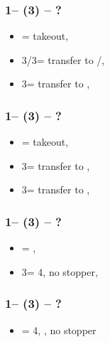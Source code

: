 \documentclass[12pt, a4paper]{article}
\begin{document}

\subsubsection*{1\clubs -- (3\clubs) -- ?}
\begin{itemize}
    \item \dbl = takeout, \gf
    \item 3\diams/3\hearts = transfer to \hearts/\spades, \invp
    \item 3\spades = transfer to \diams, \gf
\end{itemize}

\subsubsection*{1\clubs -- (3\diams) -- ?}
\begin{itemize}
    \item \dbl = takeout, \gf
    \item 3\hearts = transfer to \spades, \invp
    \item 3\spades = transfer to \diams, \gf
\end{itemize}

\subsubsection*{1\clubs -- (3\hearts) -- ?}
\begin{itemize}
    \item \dbl = \spades, \invp
    \item 3\spades = 4\spades, no \hearts stopper, \gf
\end{itemize}

\subsubsection*{1\clubs -- (3\spades) -- ?}
\begin{itemize}
    \item \dbl = 4\hearts, \gf, no \spades stopper
\end{itemize}

\end{document}

